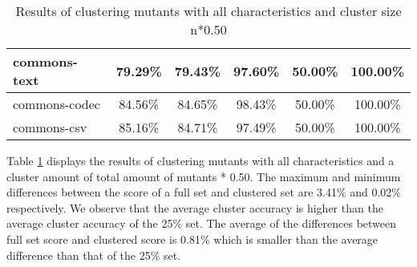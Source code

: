 \documentclass[../main]{subfiles}
\begin{document}
\begin{table}[htb]
\begin{tabular}{|l|c|c|c|c|c|}
commons-text                  & 79.29\%                                                                                 & 79.43\%                                                                                     & 97.60\%                                                                              & 50.00\%                                                                               & 100.00\%                                                                             \\ \hline
commons-codec                 & 84.56\%                                                                                 & 84.65\%                                                                                     & 98.43\%                                                                              & 50.00\%                                                                               & 100.00\%                                                                             \\ \hline
commons-csv                   & 85.16\%                                                                                 & 84.71\%                                                                                     & 97.49\%                                                                              & 50.00\%                                                                               & 100.00\%                                                                             \\ \hline
\end{tabular}
\caption{\label{tab:clustering_all_50}Results of clustering mutants with all characteristics and cluster size n*0.50}
\end{table}
\FloatBarrier

Table \ref{tab:clustering_all_50} displays the results of clustering mutants with all characteristics and a cluster amount of total amount of mutants * 0.50.
The maximum and minimum differences between the score of a full set and clustered set are 3.41\% and 0.02\% respectively.
We observe that the average cluster accuracy is higher than the average cluster accuracy of the 25\% set. 
The average of the differences between full set score and clustered score is 0.81\% which is smaller than the average difference than that of the 25\% set.
\end{document}
